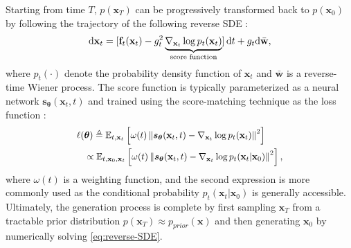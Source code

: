 Starting from time $T$, $p(\mathbf{x}_T)$ can be progressively transformed back to $p(\mathbf{x}_0)$ by following the trajectory of the following reverse SDE \cite{SDEreverse1982}:
\begin{equation}
\label{eq:reverse-SDE}
    \mathrm{d} \mathbf{x}_t=[\mathbf{f}_t(\mathbf{x}_t)-g_t^2  \underbrace{\nabla_{\mathbf{x}_t} \log p_t(\mathbf{x}_t)}_{\text{score function}}]\mathop{}\!\mathrm{d}{t} 
    + g_t \mathrm{d} \bar{\mathbf{w}},
\end{equation}
where  $p_t(\cdot)$ denote the probability density function of $\mathbf{x}_t$ and $\bar{\mathbf{w}}$ is a reverse-time Wiener process. 
%
The score function is typically parameterized as a neural network $\bm{s}_{\bm{\theta}}(\mathbf{x}_t,t)$ and trained using the score-matching technique as the loss function \cite{Scorematching2011}:
\begin{equation}
\fontsize{9.5pt}{9.5pt}\selectfont
    \begin{split}
        \ell(&\bm{\theta}) 
\triangleq \mathbb{E}_{t, \mathbf{x}_t}\left[\omega(t)\left\|\bm{s}_{\bm{\theta}}(\mathbf{x}_t,t) - \nabla_{\mathbf{x}_t} \log p_t(\mathbf{x}_t)\right\|^2\right] \\
&\propto    
\mathbb{E}_{t,\mathbf{x}_0,\mathbf{x}_t }\left[ \omega(t) \left \Vert \bm{s}_{\bm{\theta}}(\mathbf{x}_t, t) - \nabla_{\mathbf{x}_t} \log p_t (\mathbf{x}_t|\mathbf{x}_0)\right\Vert^2\right],
    \end{split}
\fontsize{10pt}{10pt}\selectfont
\end{equation}
where $\omega(t)$ is a weighting function, and the second expression is more commonly used as the conditional probability $p_t (\mathbf{x}_t|\mathbf{x}_0)$ is generally accessible.
%
Ultimately, the generation process is complete by first sampling $\mathbf{x}_T$ from a tractable prior distribution $p(\mathbf{x}_T ) \approx p_{prior}(\mathbf{x})$ and then generating $\mathbf{x}_0$ by numerically solving \cref{eq:reverse-SDE}.



